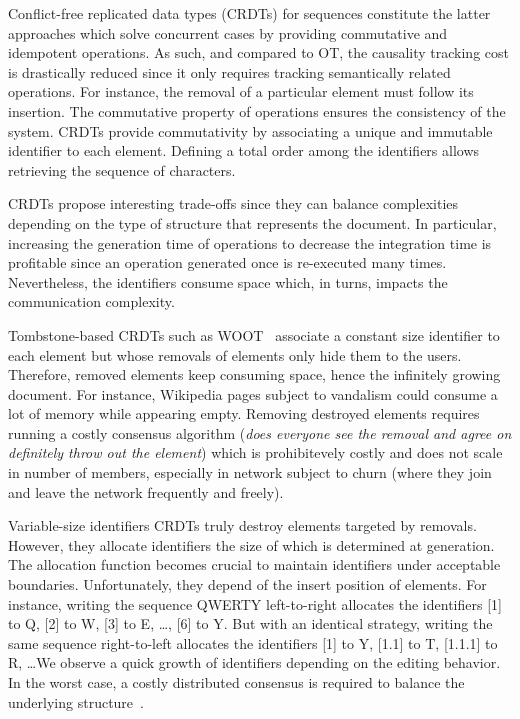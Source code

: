 \begin{asparadesc}
\item [Conflict-free replicated data types] (CRDTs) for sequences constitute the
  latter approaches which solve concurrent cases by providing commutative and
  idempotent operations. As such, and compared to OT, the causality tracking
  cost is drastically reduced since it only requires tracking semantically
  related operations. For instance, the removal of a particular element must
  follow its insertion. The commutative property of operations ensures the
  consistency of the system. CRDTs provide commutativity by associating a unique
  and immutable identifier to each element. Defining a total order among the
  identifiers allows retrieving the sequence of characters. 

  CRDTs propose interesting trade-offs since they can balance complexities
  depending on the type of structure that represents the document.  In
  particular, increasing the generation time of operations to decrease the
  integration time is profitable since an operation generated once is
  re-executed many times. Nevertheless, the identifiers consume space which, in
  turns, impacts the communication complexity.

\item [Tombstone-based] CRDTs such as WOOT~\cite{oster2006data} associate a
  constant size identifier to each element but whose removals of elements only
  hide them to the users. Therefore, removed elements keep consuming space,
  hence the infinitely growing document. For instance, Wikipedia pages subject
  to vandalism could consume a lot of memory while appearing empty. Removing
  destroyed elements requires running a costly consensus algorithm (\emph{does
    everyone see the removal and agree on definitely throw out the element})
  which is prohibitevely costly and does not scale in number of members,
  especially in network subject to churn (where they join and leave the network
  frequently and freely).

\item [Variable-size identifiers] CRDTs truly destroy elements targeted by
  removals. However, they allocate identifiers the size of which is determined
  at generation. The allocation function becomes crucial to maintain identifiers
  under acceptable boundaries. Unfortunately, they depend of the insert position
  of elements. For instance, writing the sequence QWERTY left-to-right allocates
  the identifiers [1] to Q, [2] to W, [3] to E, \ldots, [6] to Y. But with an
  identical strategy, writing the same sequence right-to-left allocates the
  identifiers [1] to Y, [1.1] to T, [1.1.1] to R, \ldots We observe a quick
  growth of identifiers depending on the editing behavior.  In the worst case, a
  costly distributed consensus is required to balance the underlying
  structure~\cite{zawirski2011asynchronous}.


\end{asparadesc}
